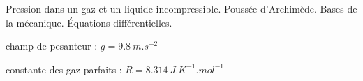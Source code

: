 \debutFicheEntrainement                                                                      %




\begin{prerequis}
	Pression dans un gaz et un liquide incompressible. 
	Poussée d'Archimède. 
	Bases de la mécanique. 
	Équations différentielles. 

\constantesUtiles
	\begin{listeConstantes}
		\item champ de pesanteur : $g=\SI{9.8}{m.s^{-2}}$
		\item constante des gaz parfaits : $R=\SI{8,314}{J.K^{-1}.mol^{-1}}$
	\end{listeConstantes}
\end{prerequis}










\hauteurLargeurCadreReponse		{7mm}{2cm}
\initialisationEntrainement

